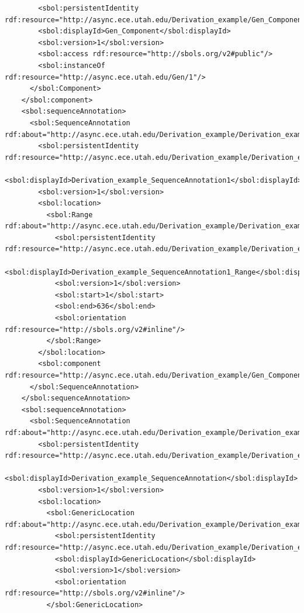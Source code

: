 \begin{lstlisting}
        <sbol:persistentIdentity rdf:resource="http://async.ece.utah.edu/Derivation_example/Gen_Component"/>
        <sbol:displayId>Gen_Component</sbol:displayId>
        <sbol:version>1</sbol:version>
        <sbol:access rdf:resource="http://sbols.org/v2#public"/>
        <sbol:instanceOf rdf:resource="http://async.ece.utah.edu/Gen/1"/>
      </sbol:Component>
    </sbol:component>
    <sbol:sequenceAnnotation>
      <sbol:SequenceAnnotation rdf:about="http://async.ece.utah.edu/Derivation_example/Derivation_example_SequenceAnnotation1/1">
        <sbol:persistentIdentity rdf:resource="http://async.ece.utah.edu/Derivation_example/Derivation_example_SequenceAnnotation1"/>
        <sbol:displayId>Derivation_example_SequenceAnnotation1</sbol:displayId>
        <sbol:version>1</sbol:version>
        <sbol:location>
          <sbol:Range rdf:about="http://async.ece.utah.edu/Derivation_example/Derivation_example_SequenceAnnotation1/Derivation_example_SequenceAnnotation1_Range/1">
            <sbol:persistentIdentity rdf:resource="http://async.ece.utah.edu/Derivation_example/Derivation_example_SequenceAnnotation1/Derivation_example_SequenceAnnotation1_Range"/>
            <sbol:displayId>Derivation_example_SequenceAnnotation1_Range</sbol:displayId>
            <sbol:version>1</sbol:version>
            <sbol:start>1</sbol:start>
            <sbol:end>636</sbol:end>
            <sbol:orientation rdf:resource="http://sbols.org/v2#inline"/>
          </sbol:Range>
        </sbol:location>
        <sbol:component rdf:resource="http://async.ece.utah.edu/Derivation_example/Gen_Component/1"/>
      </sbol:SequenceAnnotation>
    </sbol:sequenceAnnotation>
    <sbol:sequenceAnnotation>
      <sbol:SequenceAnnotation rdf:about="http://async.ece.utah.edu/Derivation_example/Derivation_example_SequenceAnnotation/1">
        <sbol:persistentIdentity rdf:resource="http://async.ece.utah.edu/Derivation_example/Derivation_example_SequenceAnnotation"/>
        <sbol:displayId>Derivation_example_SequenceAnnotation</sbol:displayId>
        <sbol:version>1</sbol:version>
        <sbol:location>
          <sbol:GenericLocation rdf:about="http://async.ece.utah.edu/Derivation_example/Derivation_example_SequenceAnnotation/GenericLocation/1">
            <sbol:persistentIdentity rdf:resource="http://async.ece.utah.edu/Derivation_example/Derivation_example_SequenceAnnotation/GenericLocation"/>
            <sbol:displayId>GenericLocation</sbol:displayId>
            <sbol:version>1</sbol:version>
            <sbol:orientation rdf:resource="http://sbols.org/v2#inline"/>
          </sbol:GenericLocation>

\end{lstlisting}
